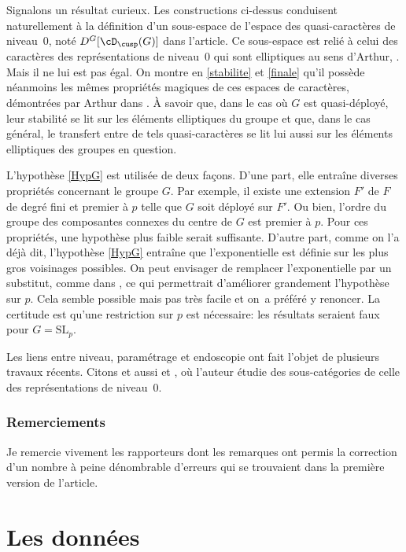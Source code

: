 Signalons un résultat curieux. Les constructions ci-dessus conduisent naturellement à la définition d'un sous-espace de l'espace des quasi-caractères de niveau~$0$, noté $D^G[\cD_{\cusp}(G)]$ dans l'article. Ce sous-espace est relié à celui des caractères des représentations de niveau~$0$ qui sont elliptiques au sens d'Arthur, \cf \cite{A2}. Mais il ne lui est pas égal. On montre en \ref{stabilite} et \ref{finale} qu'il possède néanmoins les mêmes propriétés magiques de ces espaces de caractères, démontrées par Arthur dans \cite{A3}. À savoir que, dans le cas où $G$ est quasi-déployé, leur stabilité se lit sur les éléments elliptiques du groupe et que, dans le cas général, le transfert entre de tels quasi-caractères se lit lui aussi sur les éléments elliptiques des groupes en question.

L'hypothèse \ref{HypG} est utilisée de deux façons. D'une part, elle entraîne diverses propriétés concernant le groupe $G$. Par exemple, il existe une extension $F'$ de $F$ de degré fini et premier à $p$ telle que $G$ soit déployé sur $F'$. Ou bien, l'ordre du groupe des composantes connexes du centre de $G$ est premier à $p$. Pour ces propriétés, une hypothèse plus faible serait suffisante. D'autre part, comme on l'a déjà dit, l'hypothèse \ref{HypG} entraîne que l'exponentielle est définie sur les plus gros voisinages possibles. On peut envisager de remplacer l'exponentielle par un substitut, comme dans \cite[\S1.8]{KV}, ce qui permettrait d'améliorer grandement l'hypothèse sur $p$. Cela semble possible mais pas très facile et on~a préféré y renoncer. La certitude est qu'une restriction sur $p$ est nécessaire: les résultats seraient faux pour $G=\mathrm{SL}_{p}$.

Les liens entre niveau, paramétrage et endoscopie ont fait l'objet de plusieurs travaux récents. Citons \cite{Oi} et aussi \cite{Lanard1} et \cite{Lanard2}, où l'auteur étudie des sous-catégories de celle des représentations de niveau~$0$.

\subsubsection*{Remerciements}
Je remercie vivement les rapporteurs dont les remarques ont permis la correction d'un nombre à peine dénombrable d'erreurs qui se trouvaient dans la première version de l'article.

\section{Les données}

